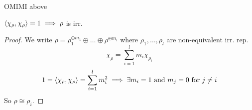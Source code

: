 OMIMI above


\begin{remark}
  $\langle\chi_\rho,\chi_\rho\rangle = 1 \implies \rho$ is irr.
  \begin{proof}
    We write $\rho = \rho_1^{\oplus m_1}\oplus\dots\oplus\rho^{\oplus m_l}$
    where $\rho_1, \dots, \rho_l$ are non-equivalent irr. rep.
    \[ \chi_\rho = \sum_{i=1}^l m_i \chi_{\rho_i} \]
    \[
      1 = \langle\chi_\rho, \chi_\rho\rangle = \sum_{i=1}^l m_i^2
      \implies \exists m_i = 1 \text{~and~} m_j = 0 \text{~for~} j \ne i
    \]
    So $\rho \cong \rho_i$.
  \end{proof}
\end{remark}
